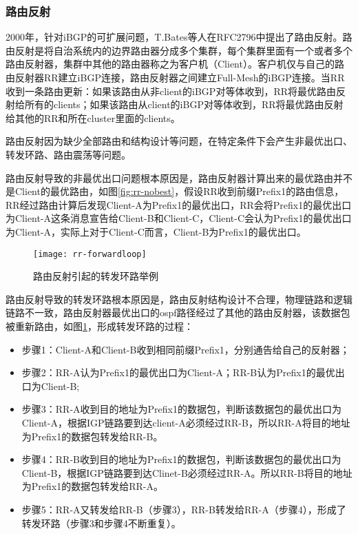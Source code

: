 \subsubsection{路由反射\cite{rfc2796}}


2000年，针对iBGP的可扩展问题，T.Bates等人在RFC2796\cite{rfc2796}中提出了路由反射。路由反射是将自治系统内的边界路由器分成多个集群，每个集群里面有一个或者多个路由反射器，集群中其他的路由器称之为客户机（Client）。客户机仅与自己的路由反射器RR建立iBGP连接，路由反射器之间建立Full-Mesh的iBGP连接。当RR收到一条路由更新：如果该路由从非client的iBGP对等体收到，RR将最优路由反射给所有的clients；如果该路由从client的iBGP对等体收到，RR将最优路由反射给其他的RR和所在cluster里面的clients。


路由反射因为缺少全部路由和结构设计等问题，在特定条件下会产生非最优出口、转发环路、路由震荡等问题。

路由反射导致的非最优出口问题根本原因是，路由反射器计算出来的最优路由并不是Client的最优路由，如图\ref{fig:rr-nobest}，假设RR收到前缀Prefix1的路由信息，RR经过路由计算后发现Client-A为Prefix1的最优出口，RR会将Prefix1的最优出口为Client-A这条消息宣告给Client-B和Client-C，Client-C会认为Prefix1的最优出口为Client-A，实际上对于Client-C而言，Client-B为Prefix1的最优出口。

\begin{figure}
  \centering
  \texttt{[image: rr-forwardloop]}
  \caption{路由反射引起的转发环路举例\cite{ibgp2016infocom}}
  \label{fig:rr-forwardloop}
\end{figure}



路由反射导致的转发环路根本原因是，路由反射结构设计不合理，物理链路和逻辑链路不一致，路由反射器最优出口的ospf路径经过了其他的路由反射器，该数据包被重新路由，如图\ref{fig:rr-forwardloop}，形成转发环路的过程：

\begin{itemize}
\item 步骤1：Client-A和Client-B收到相同前缀Prefix1，分别通告给自己的反射器；
\item 步骤2：RR-A认为Prefix1的最优出口为Client-A；RR-B认为Prefix1的最优出口为Client-B;
\item 步骤3：RR-A收到目的地址为Prefix1的数据包，判断该数据包的最优出口为Client-A，根据IGP链路要到达client-A必须经过RR-B，所以RR-A将目的地址为Prefix1的数据包转发给RR-B。
\item 步骤4：RR-B收到目的地址为Prefix1的数据包，判断该数据包的最优出口为Client-B，根据IGP链路要到达Clinet-B必须经过RR-A。所以RR-B将目的地址为Prefix1的数据包转发给RR-A。
\item 步骤5：RR-A又转发给RR-B（步骤3），RR-B转发给RR-A（步骤4），形成了转发环路（步骤3和步骤4不断重复）。
\end{itemize}



